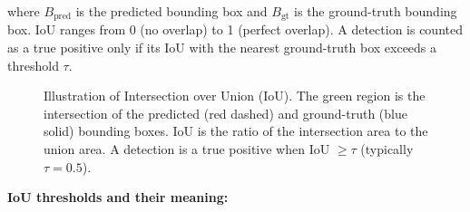 \documentclass[12pt,a4paper]{report}
\begin{document}
where $B_{\text{pred}}$ is the predicted bounding box and $B_{\text{gt}}$
is the ground-truth bounding box. IoU ranges from 0 (no overlap) to 1
(perfect overlap). A detection is counted as a true positive only if its
IoU with the nearest ground-truth box exceeds a threshold $\tau$.

\begin{figure}[H]
\centering
{}
\caption[Intersection over Union (IoU) illustration]{Illustration of Intersection over Union (IoU). The green region is
the intersection of the predicted (red dashed) and ground-truth (blue solid)
bounding boxes. IoU is the ratio of the intersection area to the union area.
A detection is a true positive when IoU $\geq \tau$ (typically $\tau = 0.5$).}
\label{fig:iou}
\end{figure}

\textbf{IoU thresholds and their meaning:}
\end{document}
